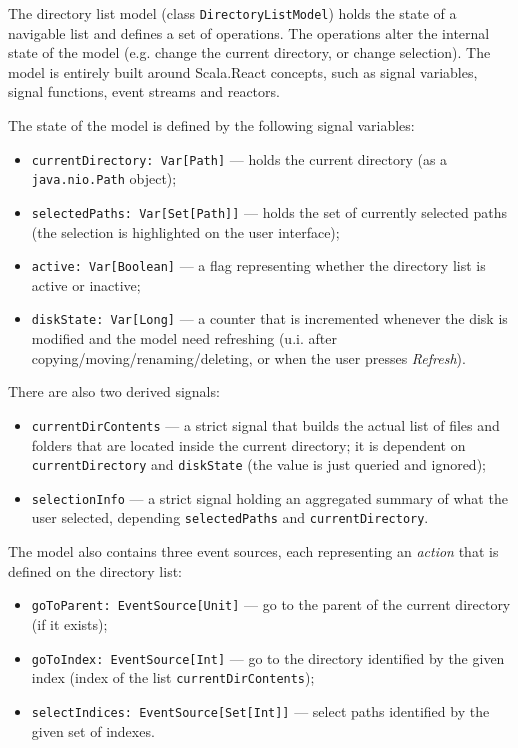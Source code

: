 The directory list model (class \texttt{DirectoryListModel}) holds the state of a navigable list and defines a set of operations. The operations alter the internal state of the model (e.g. change the current directory, or change selection). The model is entirely built around Scala.React concepts, such as signal variables, signal functions, event streams and reactors.

The state of the model is defined by the following signal variables:
\begin{itemize}
\item \texttt{currentDirectory: Var[Path]} --- holds the current directory (as a \texttt{java.nio.Path} object);
\item \texttt{selectedPaths: Var[Set[Path]]} --- holds the set of currently selected paths (the selection is highlighted on the user interface);
\item \texttt{active: Var[Boolean]} --- a flag representing whether the directory list is active or inactive;
\item \texttt{diskState: Var[Long]} --- a counter that is incremented whenever the disk is modified and the model need refreshing (u.i. after copying/moving/renaming/deleting, or when the user presses \emph{Refresh}).
\end{itemize}

There are also two derived signals:
\begin{itemize}

\item \texttt{currentDirContents} --- a strict signal that builds the actual list of files and folders that are located inside the current directory; it is dependent on \texttt{currentDirectory} and \texttt{diskState} (the value is just queried and ignored);

\item \texttt{selectionInfo} --- a strict signal holding an aggregated summary of what the user selected, depending \texttt{selectedPaths} and \texttt{currentDirectory}.
\end{itemize}

The model also contains three event sources, each representing an \emph{action} that is defined on the directory list:
\begin{itemize}
\item \texttt{goToParent: EventSource[Unit]} --- go to the parent of the current directory (if it exists);
\item \texttt{goToIndex: EventSource[Int]} --- go to the directory identified by the given index (index of the list \texttt{currentDirContents});
\item \texttt{selectIndices: EventSource[Set[Int]]} --- select paths identified by the given set of indexes.
\end{itemize}

